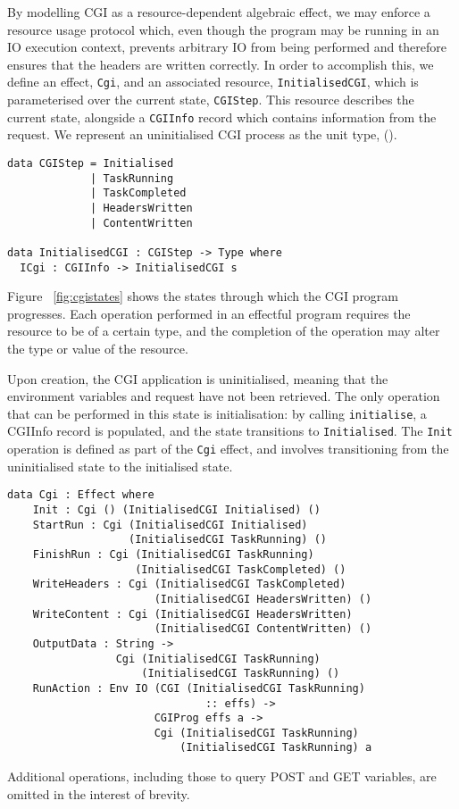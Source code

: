 \documentclass[preprint]{sigplanconf}
\begin{document}
By modelling CGI as a resource-dependent algebraic effect, we may enforce a resource usage protocol which, even though the program may be running in an IO execution context, prevents arbitrary IO from being performed and therefore ensures that the headers are written correctly. In order to accomplish this, we define an effect, \texttt{Cgi}, and an associated resource, \texttt{InitialisedCGI}, which is parameterised over the current state, \texttt{CGIStep}. This resource describes the current state, alongside a \texttt{CGIInfo} record which contains information from the request. We represent an uninitialised CGI process as the unit type, ().
\begin{Verbatim}[samepage]
data CGIStep = Initialised 
             | TaskRunning 
             | TaskCompleted 
             | HeadersWritten 
             | ContentWritten

data InitialisedCGI : CGIStep -> Type where
  ICgi : CGIInfo -> InitialisedCGI s
\end{Verbatim}
Figure ~\ref{fig:cgistates} shows the states through which the CGI program progresses. Each operation performed in an effectful program requires the resource to be of a certain type, and the completion of the operation may alter the type or value of the resource.

Upon creation, the CGI application is uninitialised, meaning that the environment variables and request have not been retrieved. The only operation that can be performed in this state is initialisation: by calling \texttt{initialise}, a CGIInfo record is populated, and the state transitions to \texttt{Initialised}. The \texttt{Init} operation is defined as part of the \texttt{Cgi} effect, and involves transitioning from the uninitialised state to the initialised state.

\begin{Verbatim}
data Cgi : Effect where
    Init : Cgi () (InitialisedCGI Initialised) ()
    StartRun : Cgi (InitialisedCGI Initialised) 
                   (InitialisedCGI TaskRunning) ()
    FinishRun : Cgi (InitialisedCGI TaskRunning) 
                    (InitialisedCGI TaskCompleted) ()
    WriteHeaders : Cgi (InitialisedCGI TaskCompleted) 
                       (InitialisedCGI HeadersWritten) ()
    WriteContent : Cgi (InitialisedCGI HeadersWritten) 
                       (InitialisedCGI ContentWritten) ()
    OutputData : String -> 
                 Cgi (InitialisedCGI TaskRunning) 
                     (InitialisedCGI TaskRunning) ()
    RunAction : Env IO (CGI (InitialisedCGI TaskRunning) 
                               :: effs) -> 
                       CGIProg effs a -> 
                       Cgi (InitialisedCGI TaskRunning) 
                           (InitialisedCGI TaskRunning) a
\end{Verbatim}
Additional operations, including those to query POST and GET variables, are omitted in the interest of brevity.
\end{document}

